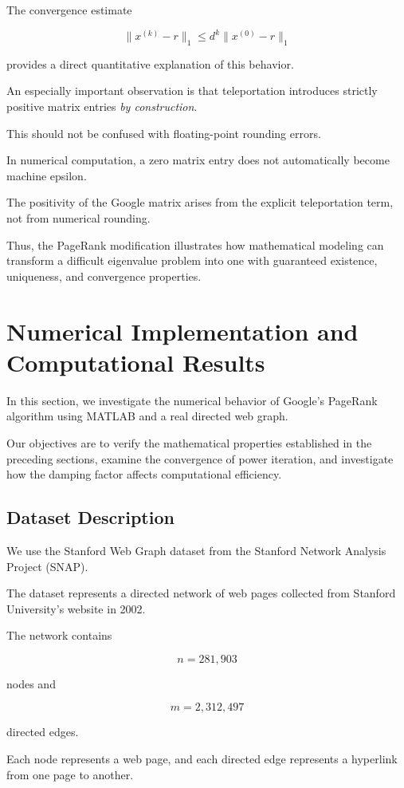 \documentclass[11pt,a4paper]{article}
\theoremstyle{definition}
\theoremstyle{remark}
\begin{document}
The convergence estimate

\[
\|x^{(k)}-r\|_1
\leq
d^k\|x^{(0)}-r\|_1
\]

provides a direct
quantitative explanation
of this behavior.

An especially important
observation is that
teleportation introduces
strictly positive
matrix entries
\emph{by construction}.

This should not be
confused with floating-point
rounding errors.

In numerical computation,
a zero matrix entry
does not automatically
become machine epsilon.

The positivity of the
Google matrix arises
from the explicit
teleportation term,
not from numerical
rounding.

Thus, the PageRank
modification illustrates
how mathematical modeling
can transform a difficult
eigenvalue problem into
one with guaranteed
existence, uniqueness,
and convergence properties.

\section{Numerical Implementation and
Computational Results}

In this section, we investigate the
numerical behavior of Google's PageRank
algorithm using MATLAB and a real
directed web graph.

Our objectives are to verify the
mathematical properties established
in the preceding sections, examine
the convergence of power iteration,
and investigate how the damping
factor affects computational efficiency.

\subsection{Dataset Description}

We use the Stanford Web Graph dataset
from the Stanford Network Analysis
Project (SNAP).

The dataset represents a directed
network of web pages collected from
Stanford University's website in 2002.

The network contains

\[
n=281{,}903
\]

nodes and

\[
m=2{,}312{,}497
\]

directed edges.

Each node represents a web page,
and each directed edge represents
a hyperlink from one page to another.
\end{document}
